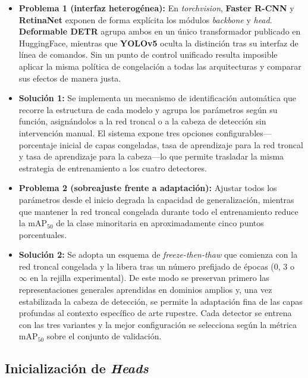 \begin{itemize}

  \item \textbf{Problema 1 (interfaz heterogénea):}
        En \emph{torchvision}, \textbf{Faster R-CNN} y \textbf{RetinaNet} exponen de forma explícita los módulos \emph{backbone} y \emph{head}.
        \textbf{Deformable DETR} agrupa ambos en un único transformador publicado en HuggingFace, mientras que \textbf{YOLOv5} oculta la distinción tras su interfaz de línea de comandos.
        Sin un punto de control unificado resulta imposible aplicar la misma política de congelación a todas las arquitecturas y comparar sus efectos de manera justa.

  \item \textbf{Solución 1:}
        Se implementa un mecanismo de identificación automática que recorre la estructura de cada modelo y agrupa los parámetros según su función, asignándolos a la red troncal o a la cabeza de detección sin intervención manual.
        El sistema expone tres opciones configurables—porcentaje inicial de capas congeladas, tasa de aprendizaje para la red troncal y tasa de aprendizaje para la cabeza—lo que permite trasladar la misma estrategia de entrenamiento a los cuatro detectores.

  \item \textbf{Problema 2 (sobreajuste frente a adaptación):}
        Ajustar todos los parámetros desde el inicio degrada la capacidad de generalización, mientras que mantener la red troncal congelada durante todo el entrenamiento reduce la \(\text{mAP}_{50}\) de la clase minoritaria en aproximadamente cinco puntos porcentuales.

  \item \textbf{Solución 2:}
        Se adopta un esquema de \emph{freeze-then-thaw} que comienza con la red troncal congelada y la libera tras un número prefijado de épocas (\(0\), \(3\) o \(\infty\) en la rejilla experimental).
        De este modo se preservan primero las representaciones generales aprendidas en dominios amplios y, una vez estabilizada la cabeza de detección, se permite la adaptación fina de las capas profundas al contexto específico de arte rupestre.
        Cada detector se entrena con las tres variantes y la mejor configuración se selecciona según la métrica \(\text{mAP}_{50}\) sobre el conjunto de validación.

\end{itemize}

\subsection{Inicialización de \emph{Heads}}\label{ssec:init_heads}

